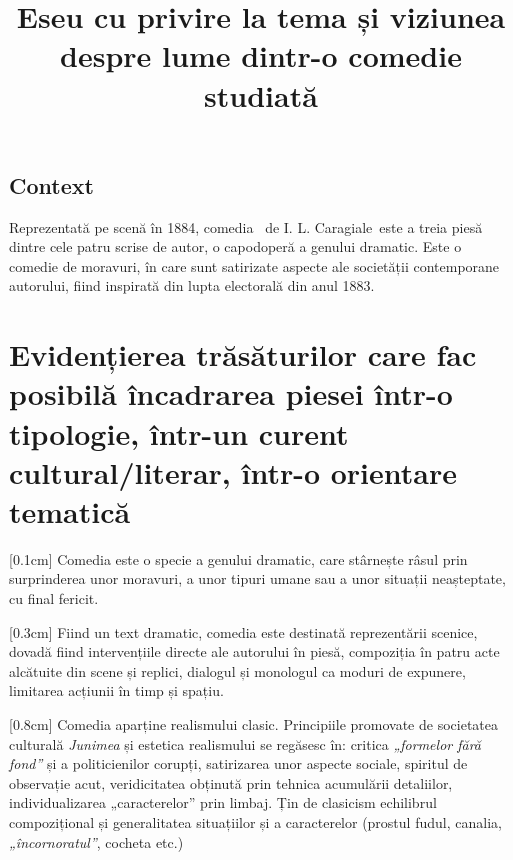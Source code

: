 

\newcommand{\operatitle}{\textbfit{„O scrisoare pierdută”}} %
\newcommand{\operaauthor}{I. L. Caragiale} %

\title{Eseu cu privire la tema și viziunea despre lume dintr-o comedie studiată}



\maketitle %



\subsection{Context}

Reprezentată pe scenă în 1884, comedia \operatitle\ de \operaauthor\ este a treia piesă dintre cele patru scrise de autor, o capodoperă a genului dramatic. Este o comedie de moravuri, în care sunt satirizate aspecte ale societății contemporane autorului, fiind inspirată din lupta electorală din anul 1883.


\section{Evidențierea trăsăturilor care fac posibilă încadrarea piesei într-o tipologie, într-un curent cultural/literar, într-o orientare tematică}

[0.1cm]
Comedia este o specie a genului dramatic, care stârnește râsul prin surprinderea unor moravuri, a unor tipuri umane sau a unor situații neașteptate, cu final fericit.

[0.3cm]
Fiind un text dramatic, comedia este destinată reprezentării scenice, dovadă fiind intervențiile directe ale autorului în piesă, compoziția în patru acte alcătuite din scene și replici, dialogul și monologul ca moduri de expunere, limitarea acțiunii în timp și spațiu.

[0.8cm]
Comedia aparține realismului clasic. Principiile promovate de societatea culturală \textit{Junimea} și estetica realismului se regăsesc în: critica \textit{„formelor fără fond”} și a politicienilor corupți, satirizarea unor aspecte sociale, spiritul de observație acut, veridicitatea obținută prin tehnica acumulării detaliilor, individualizarea „caracterelor” prin limbaj. Țin de clasicism echilibrul compozițional și generalitatea situațiilor și a caracterelor (prostul fudul, canalia, \textit{„încornoratul”}, cocheta etc.)


